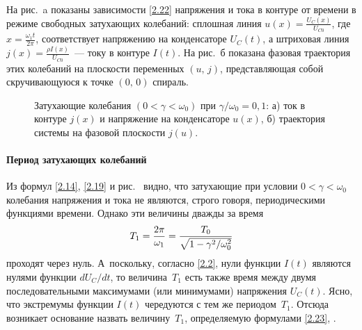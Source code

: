 На рис.~a показаны 
зависимости \eqref{2.22} напряжения и тока в контуре от времени в режиме
свободных затухающих колебаний: сплошная линия 
$u(x)=\frac{U_C(x)}{U_{C0}}$, где
$x=\frac{\omega_1t}{2\pi}$, 
соответствует напряжению на конденсаторе $U_C(t)$, а
штриховая линия $j(x)=\frac{\rho I(x)}{U_{C0}}$~--- току в контуре $I(t)$. 
На рис.~б показана фазовая траектория этих колебаний на плоскости
переменных $(u,\,j)$, представляющая собой скручивающуюся 
к точке $(0,\,0)$ спираль.

\begin{figure}[h]
	\begin{minipage}[h]{0.5\linewidth}
		\centering
	\end{minipage}
	\hfill
	\begin{minipage}[h]{0.5\linewidth}
		\centering
	\end{minipage}
	\caption{Затухающие колебания $(0<\gamma<\omega_0)$ при
$\gamma/\omega_0=0,1$:
а) ток в контуре $j(x)$ и напряжение на конденсаторе $u(x)$,
б) траектория системы на фазовой плоскости $j(u)$.}
\end{figure}

\paragraph{Период затухающих колебаний}

Из формул \eqref{2.14}, \eqref{2.19} и рис.~ видно, что затухающие
при условии $0<\gamma<\omega_0$ колебания напряжения и тока не являются,
строго говоря, периодическими функциями времени. 
Однако эти величины дважды за время
\begin{equation}\eqmark{2.23}
T_1=\dfrac{2\pi}{\omega_1}=\dfrac{T_0}{\sqrt{1-\gamma^2/\omega_0^2}}
\end{equation}
проходят через нуль. А~поскольку, согласно \eqref{2.2}, нули функции $I(t)$ являются
нулями функции $dU_C/dt$, то величина~$T_1$ есть также время между двумя
последовательными максимумами (или минимумами) напряжения $U_C(t)$.
Ясно, что экстремумы функции $I(t)$ чередуются с тем же периодом~$T_1$. 
Отсюда возникает основание назвать величину~$T_1$, 
определяемую формулами \eqref{2.23}, .

